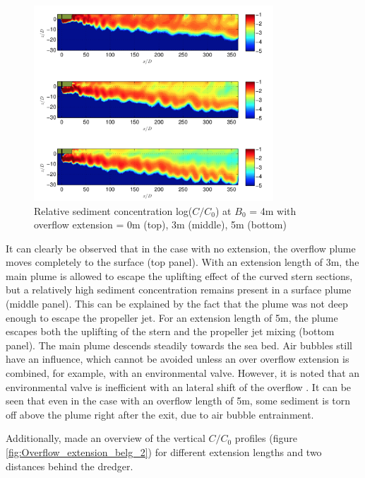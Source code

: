 \begin{figure}[ht!]
    \centering
    \includegraphics[width = 0.8\textwidth]{Images/Overflow_extension_belg.png}
    \caption{Relative sediment concentration log($C/C_0$) at $B_0$ =  4m with overflow extension =  0m (top), 3m (middle), 5m (bottom)}
    \label{fig:Overflow_extension_belg}
\end{figure}

\noindent It can clearly be observed that in the case with no extension, the overflow plume moves completely to the surface (top panel). With an extension length of 3m, the main plume is allowed to escape the uplifting effect of the curved stern sections, but a relatively high sediment concentration remains present in a surface plume (middle panel). This can be explained by the fact that the plume was not deep enough to escape the propeller jet. For an extension length of 5m, the plume escapes both the uplifting of the stern and the propeller jet mixing (bottom panel). The main plume descends steadily towards the sea bed. Air bubbles still have an influence, which cannot be avoided unless an over
overflow extension is combined, for example, with an environmental valve. However, it is noted that an environmental valve is inefficient with an lateral shift of the overflow \citep{Decrop}. It can be seen that even in the case with an overflow length of 5m, some sediment is torn off above the plume right after the exit, due to air bubble entrainment. \newline

\noindent Additionally, \cite{Decrop} made an overview of the vertical $C/C_0$ profiles (figure \ref{fig:Overflow_extension_belg_2}) for different extension lengths and two distances behind the dredger.


